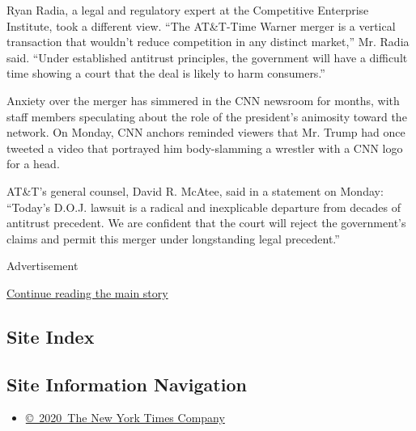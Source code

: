 Ryan Radia, a legal and regulatory expert at the Competitive Enterprise
Institute, took a different view. ``The AT\&T-Time Warner merger is a
vertical transaction that wouldn't reduce competition in any distinct
market,'' Mr. Radia said. ``Under established antitrust principles, the
government will have a difficult time showing a court that the deal is
likely to harm consumers.''

Anxiety over the merger has simmered in the CNN newsroom for months,
with staff members speculating about the role of the president's
animosity toward the network. On Monday, CNN anchors reminded viewers
that Mr. Trump had once tweeted a video that portrayed him body-slamming
a wrestler with a CNN logo for a head.

AT\&T's general counsel, David R. McAtee, said in a statement on Monday:
``Today's D.O.J. lawsuit is a radical and inexplicable departure from
decades of antitrust precedent. We are confident that the court will
reject the government's claims and permit this merger under longstanding
legal precedent.''

Advertisement

\protect\hyperlink{after-bottom}{Continue reading the main story}

\hypertarget{site-index}{%
\subsection{Site Index}\label{site-index}}

\hypertarget{site-information-navigation}{%
\subsection{Site Information
Navigation}\label{site-information-navigation}}

\begin{itemize}
\tightlist
\item
  \href{https://help.nytimes.com/hc/en-us/articles/115014792127-Copyright-notice}{©~2020~The
  New York Times Company}
\end{itemize}

